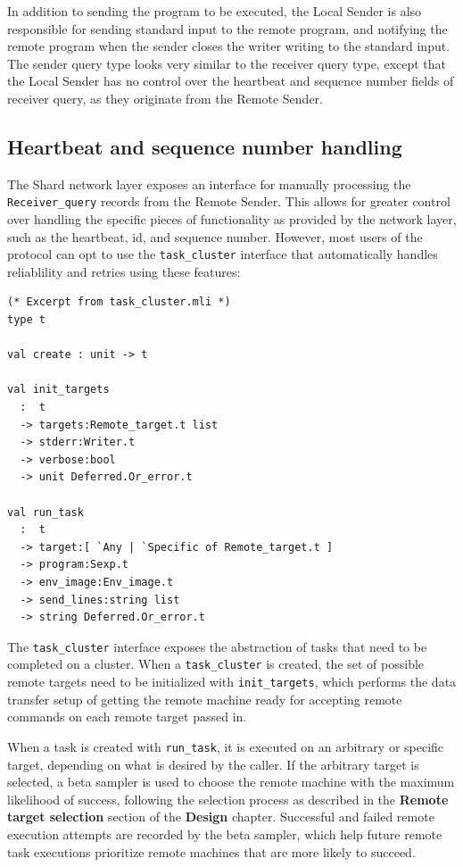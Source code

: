\documentclass[twoside]{report}
\begin{document}
In addition to sending the program to be executed, the Local Sender is also responsible for sending standard input to the remote program, and notifying the remote program when the sender closes the writer writing to the standard input.
The sender query type looks very similar to the receiver query type, except that the Local Sender has no control over the heartbeat and sequence number fields of receiver query, as they originate from the Remote Sender.

\subsection{Heartbeat and sequence number handling}

The Shard network layer exposes an interface for manually processing the \texttt{Receiver\_query} records from the Remote Sender.
This allows for greater control over handling the specific pieces of functionality as provided by the network layer, such as the heartbeat, id, and sequence number. However, most users of the protocol can opt to use the \texttt{task\_cluster} interface that automatically handles reliablility and retries using these features:

\begin{minipage}[c]{\textwidth-15pt}
  \begin{lstlisting}
(* Excerpt from task_cluster.mli *)
type t

val create : unit -> t

val init_targets
  :  t
  -> targets:Remote_target.t list
  -> stderr:Writer.t
  -> verbose:bool
  -> unit Deferred.Or_error.t

val run_task
  :  t
  -> target:[ `Any | `Specific of Remote_target.t ]
  -> program:Sexp.t
  -> env_image:Env_image.t
  -> send_lines:string list
  -> string Deferred.Or_error.t
\end{lstlisting}
  \smallskip
\end{minipage}

The \texttt{task\_cluster} interface exposes the abstraction of tasks that need to be completed on a cluster.
When a \texttt{task\_cluster} is created, the set of possible remote targets need to be initialized with \texttt{init\_targets}, which performs the data transfer setup of getting the remote machine ready for accepting remote commands on each remote target passed in.

When a task is created with \texttt{run\_task}, it is executed on an arbitrary or specific target, depending on what is desired by the caller.
If the arbitrary target is selected, a beta sampler is used to choose the remote machine with the maximum likelihood of success, following the selection process as described in the \textbf{Remote target selection} section of the \textbf{Design} chapter.
Successful and failed remote execution attempts are recorded by the beta sampler, which help future remote task executions prioritize remote machines that are more likely to succeed.
\end{document}
